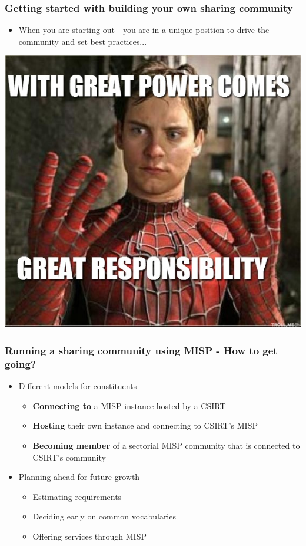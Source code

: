 \begin{frame}
\frametitle{Getting started with building your own sharing community}
\begin{itemize}
	\item When you are starting out - you are in a unique position to drive the community and set best practices...
\end{itemize}
\includegraphics[scale=0.3]{screenshots/power-responsibility.png}
\end{frame}

\begin{frame}
\frametitle{Running a sharing community using MISP - How to get going?}
\begin{itemize}
	\item Different models for constituents
	\begin{itemize}
        \item {\bf Connecting to} a MISP instance hosted by a CSIRT
        \item {\bf Hosting} their own instance and connecting to CSIRT's MISP
        \item {\bf Becoming member} of a sectorial MISP community that is connected to CSIRT's community
	\end{itemize}
	\item Planning ahead for future growth
	\begin{itemize}
		\item Estimating requirements
		\item Deciding early on common vocabularies
		\item Offering services through MISP
	\end{itemize}
\end{itemize}
\end{frame}

